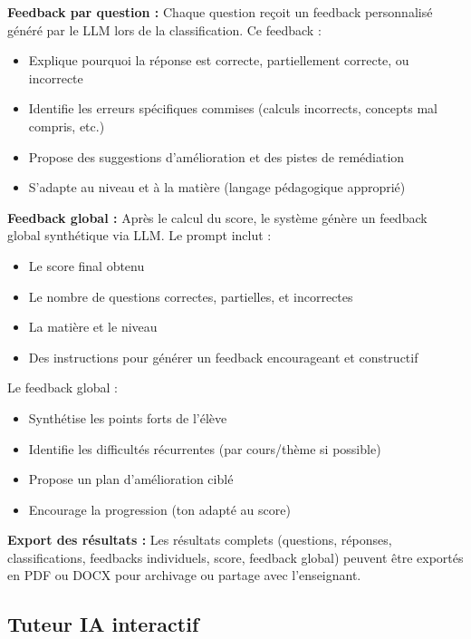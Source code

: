 \textbf{Feedback par question :}
Chaque question reçoit un feedback personnalisé généré par le LLM lors de la classification. Ce feedback :
\begin{itemize}
    \item Explique pourquoi la réponse est correcte, partiellement correcte, ou incorrecte
    \item Identifie les erreurs spécifiques commises (calculs incorrects, concepts mal compris, etc.)
    \item Propose des suggestions d'amélioration et des pistes de remédiation
    \item S'adapte au niveau et à la matière (langage pédagogique approprié)
\end{itemize}

\textbf{Feedback global :}
Après le calcul du score, le système génère un feedback global synthétique via LLM. Le prompt inclut :
\begin{itemize}
    \item Le score final obtenu
    \item Le nombre de questions correctes, partielles, et incorrectes
    \item La matière et le niveau
    \item Des instructions pour générer un feedback encourageant et constructif
\end{itemize}

Le feedback global :
\begin{itemize}
    \item Synthétise les points forts de l'élève
    \item Identifie les difficultés récurrentes (par cours/thème si possible)
    \item Propose un plan d'amélioration ciblé
    \item Encourage la progression (ton adapté au score)
\end{itemize}

\textbf{Export des résultats :}
Les résultats complets (questions, réponses, classifications, feedbacks individuels, score, feedback global) peuvent être exportés en PDF ou DOCX pour archivage ou partage avec l'enseignant.

\subsection{Tuteur IA interactif}

